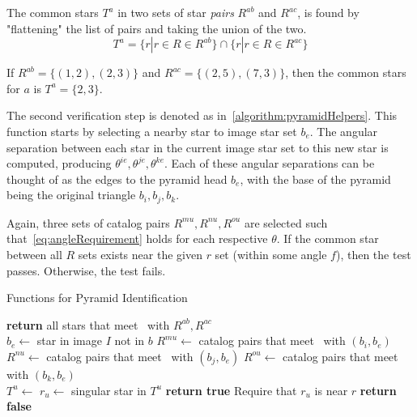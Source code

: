The common stars $T^a$ in two sets of star \textit{pairs} $R^{ab}$ and $R^{ac}$, is found by "flattening" the list of
pairs and taking the union of the two.
\begin{equation}
    \label{eq:commonStarsPyramid}
    T^a = \{ r | r \in R \in R^{ab} \} \cap \{ r | r \in R \in R^{ac} \}
\end{equation}

If $R^{ab} = \{ (1, 2), (2, 3) \}$ and $R^{ac} = \{ (2, 5), (7, 3) \}$, then the common stars for $a$ is
$T^a = \{2, 3\}$.


The second verification step is denoted as  in~\autoref{algorithm:pyramidHelpers}.
This function starts by selecting a nearby star to image star set $b_e$.
The angular separation between each star in the current image star set to this new star is computed, producing
$\theta^{ie}, \theta^{je}, \theta^{ke}$.
Each of these angular separations can be thought of as the edges to the pyramid head $b_e$, with the base of the pyramid
being the original triangle $b_i, b_j, b_k$.

Again, three sets of catalog pairs $R^{mu}, R^{nu}, R^{ou}$ are selected such that~\autoref{eq:angleRequirement} holds
for each respective $\theta$.
If the common star between all $R$ sets exists near the given $r$ set (within some angle $f$), then the test passes.
Otherwise, the test fails.

\begin{algorithm}
    \caption{Functions for Pyramid Identification} \label{algorithm:pyramidHelpers}
    \begin{algorithmic}[1]
        \State \textbf{return} all stars that meet~ with $R^{ab}, R^{ac}$
        \EndFunction
        \\
        \State $b_e \gets $ star in image $I$ not in $b$
        \State $R^{mu} \gets$ catalog pairs that meet~ with $(b_i, b_e)$
        \State $R^{nu} \gets$ catalog pairs that meet~ with $(b_j, b_e)$
        \State $R^{ou} \gets$ catalog pairs that meet~ with $(b_k, b_e)$
        \\
        \State $T^u \gets $ 
        \State $r_u \gets $ singular star in $T^u$
        \State \textbf{return true} \Comment Require that $r_u$ is near $r$
        \EndIf
        \EndIf
        \State \textbf{return false}
        \EndFunction
    \end{algorithmic}
\end{algorithm}

